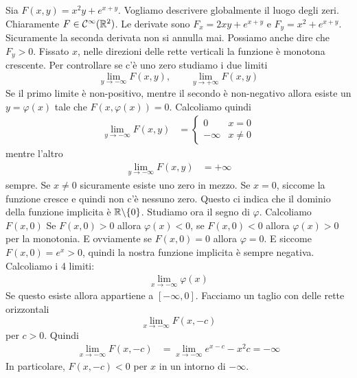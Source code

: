 \documentclass[a4paper]{article}
\begin{document}
\begin{radioactive}
\begin{snippetexample}{}
    Sia \(F(x,y)= x^2y + e^{x+y}\).
    Vogliamo descrivere globalmente il luogo degli zeri.
    Chiaramente \(F \in \mathcal{C}^\infty(\mathbb{R}^2)\).
    Le derivate sono \(F_x = 2xy + e^{x+y}\)
    e \(F_y = x^2 + e^{x+y}\).
    Sicuramente la seconda derivata non si annulla mai.
    Possiamo anche dire che \(F_y > 0\).
    Fissato \(x\), nelle direzioni delle rette verticali
    la funzione è monotona crescente.
    Per controllare se c'è uno zero studiamo i due limiti
    \[
        \lim_{y\to -\infty} F(x, y), \qquad
        \lim_{y\to +\infty} F(x, y)
    \]
    Se il primo limite è non-positivo, mentre il secondo è non-negativo
    allora esiste un \(y = \varphi(x)\)
    tale che \(F(x, \varphi(x)) = 0\). Calcoliamo quindi
    \begin{align*}
        \lim_{y\to -\infty} F(x, y)
        &= \begin{cases}
            0 & x=0 \\
            -\infty & x \neq 0
        \end{cases}
    \end{align*}
    mentre l'altro
    \begin{align*}
        \lim_{y\to -\infty} F(x, y)
        &= +\infty
    \end{align*}
    sempre.
    Se \(x \neq 0\) sicuramente esiste uno zero in mezzo.
    Se \(x = 0\), siccome la funzione cresce e quindi non c'è nessuno zero.
    Questo ci indica che il dominio della funzione implicita è
    \(\mathbb{R} \backslash \{0\}\).
    Studiamo ora il segno di \(\varphi\).
    Calcoliamo \(F(x, 0)\)
    Se \(F(x, 0)> 0\) allora \(\varphi(x) < 0\),
    se \(F(x,0)<0\) allora \(\varphi(x)> 0\) per la monotonia.
    E ovviamente se \(F(x,0)=0\) allora \(\varphi=0\).
    E siccome \(F(x,0) = e^x > 0\),
    quindi la nostra funzione implicita è sempre negativa.
    Calcoliamo i 4 limiti:
    \begin{align*}
        \lim_{x\to -\infty} \varphi(x)
    \end{align*}
    Se questo esiste allora appartiene a \([-\infty, 0]\). 
    Facciamo un taglio con delle rette orizzontali
    \[
        \lim_{x\to -\infty} F(x, -c)
    \]
    per \(c>0\). Quindi
    \begin{align*}
        \lim_{x\to -\infty} F(x, -c)
        &= \lim_{x\to -\infty} e^{x-c} -x^2c = -\infty
    \end{align*}
    In particolare, \(F(x, -c) < 0\) per \(x\) in un intorno di \(-\infty\).

\end{snippetexample}
\end{radioactive}
\end{document}

